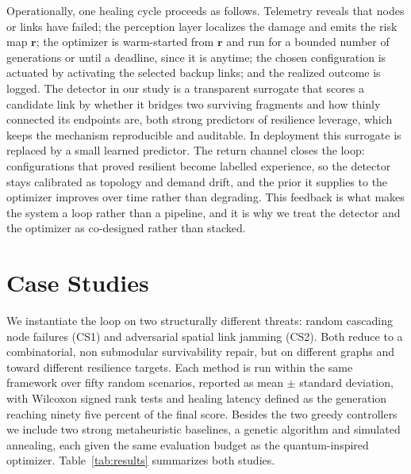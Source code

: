 \documentclass[journal]{IEEEtran}
\begin{document}
Operationally, one healing cycle proceeds as follows. Telemetry reveals that nodes or links have failed; the perception layer localizes the damage and emits the risk map $\mathbf{r}$; the optimizer is warm-started from $\mathbf{r}$ and run for a bounded number of generations or until a deadline, since it is anytime; the chosen configuration is actuated by activating the selected backup links; and the realized outcome is logged. The detector in our study is a transparent surrogate that scores a candidate link by whether it bridges two surviving fragments and how thinly connected its endpoints are, both strong predictors of resilience leverage, which keeps the mechanism reproducible and auditable. In deployment this surrogate is replaced by a small learned predictor. The return channel closes the loop: configurations that proved resilient become labelled experience, so the detector stays calibrated as topology and demand drift, and the prior it supplies to the optimizer improves over time rather than degrading. This feedback is what makes the system a loop rather than a pipeline, and it is why we treat the detector and the optimizer as co-designed rather than stacked.

\section{Case Studies}\label{sec:cases}

We instantiate the loop on two structurally different threats: random cascading node failures (CS1) and adversarial spatial link jamming (CS2). Both reduce to a combinatorial, non submodular survivability repair, but on different graphs and toward different resilience targets. Each method is run within the same framework over fifty random scenarios, reported as mean $\pm$ standard deviation, with Wilcoxon signed rank tests and healing latency defined as the generation reaching ninety five percent of the final score. Besides the two greedy controllers we include two strong metaheuristic baselines, a genetic algorithm and simulated annealing, each given the same evaluation budget as the quantum-inspired optimizer. Table~\ref{tab:results} summarizes both studies.
\end{document}
